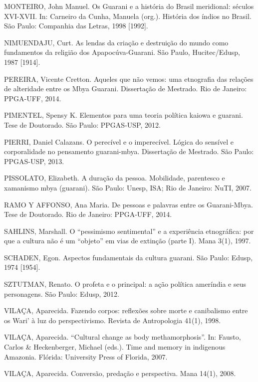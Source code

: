\documentclass{article}
\begin{document}
MONTEIRO, John Manuel. Os Guarani e a hist\'oria do Brasil meridional:
s\'eculos XVI-XVII. In: Carneiro da Cunha, Manuela (org.). Hist\'oria
dos \'indios no Brasil. S\~ao Paulo: Companhia das Letras, 1998 [1992].

NIMUENDAJU, Curt. As lendas da cria\c{c}\~ao e destrui\c{c}\~ao do mundo
como fundamentos da religi\~ao dos Apapoc\'uva-Guarani. S\~ao Paulo,
Hucitec/Edusp, 1987 [1914].

PEREIRA, Vicente Cretton. Aqueles que n\~ao vemos: uma etnografia das
rela\c{c}\~oes de alteridade entre os Mbya Guarani. Disserta\c{c}\~ao
de Mestrado. Rio de Janeiro: PPGA-UFF, 2014.

PIMENTEL, Spensy K. Elementos para uma teoria pol\'itica kaiowa e
guarani. Tese de Doutorado. S\~ao Paulo: PPGAS-USP, 2012.

PIERRI, Daniel Calazans. O perec\'ivel e o imperec\'ivel. L\'ogica do
sens\'ivel e corporalidade no pensamento guarani-mbya.
Disserta\c{c}\~ao de Mestrado. S\~ao Paulo: PPGAS-USP, 2013.

PISSOLATO, Elizabeth. A dura\c{c}\~ao da pessoa. Mobilidade, parentesco
e xamanismo mbya (guarani). S\~ao Paulo: Unesp, ISA; Rio de Janeiro:
NuTI, 2007.

RAMO Y AFFONSO, Ana Maria. De pessoas e palavras entre os Guarani-Mbya.
Tese de Doutorado. Rio de Janeiro: PPGA-UFF, 2014.

SAHLINS, Marshall. O {\textquotedblleft}pessimismo
sentimental{\textquotedblright} e a experi\^encia etnogr\'afica: por
que a cultura n\~ao \'e um
{\textquotedblleft}objeto{\textquotedblright} em vias de extin\c{c}\~ao
(parte I). Mana 3(1), 1997.

SCHADEN, Egon. Aspectos fundamentais da cultura guarani. S\~ao Paulo:
Edusp, 1974 [1954].

SZTUTMAN, Renato. O profeta e o principal: a a\c{c}\~ao pol\'itica
amer\'india e seus personagens. S\~ao Paulo: Edusp, 2012.

VILA\c{C}A, Aparecida. Fazendo corpos: reflex\~oes sobre morte e
canibalismo entre os Wari{\textquoteright} \`a luz do perspectivismo.
Revista de Antropologia 41(1), 1998.

VILA\c{C}A, Aparecida. {\textquotedblleft}Cultural change as body
methamorphosis{\textquotedblright}. In: Fausto, Carlos \& Heckenberger,
Michael (eds.). Time and memory in indigenous Amazonia. Fl\'orida:
University Press of Florida, 2007.

VILA\c{C}A, Aparecida. Convers\~ao, preda\c{c}\~ao e perspectiva. Mana
14(1), 2008.
\end{document}
